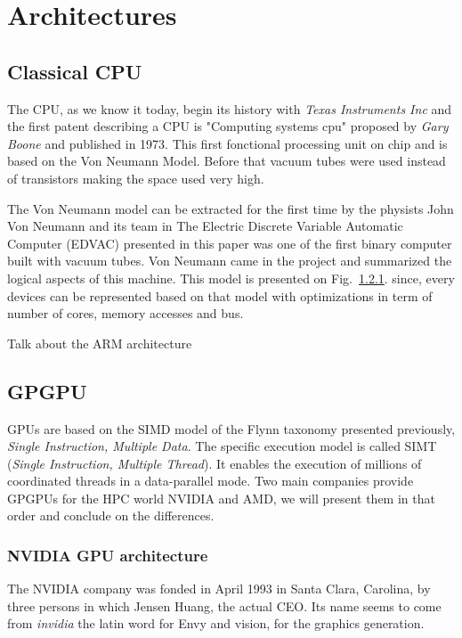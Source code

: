 \section{Architectures}
\subsection{Classical CPU}

The CPU, as we know it today, begin its history with \textit{Texas Instruments Inc} and the first patent describing a CPU is "Computing systems cpu" proposed by \textit{Gary Boone} and published in 1973.
This first fonctional processing unit on chip and is based on the Von Neumann Model.
Before that vacuum tubes were used instead of transistors making the space used very high.

The Von Neumann model can be extracted for the first time by the physists John Von Neumann and its team in \cite{} 
The Electric Discrete Variable Automatic Computer (EDVAC) presented in this paper was one of the first binary computer built with vacuum tubes. Von Neumann came in the project and summarized the logical aspects of this machine. 
This model is presented on Fig.~\ref{}.
since, every devices can be represented based on that model with optimizations in term of number of cores, memory accesses and bus. 




Talk about the ARM architecture 

\subsection{GPGPU}

GPUs are based on the SIMD model of the Flynn taxonomy presented previously, \emph{Single Instruction, Multiple Data}.
The specific execution model is called SIMT (\emph{Single Instruction, Multiple Thread}). It enables the execution of millions of coordinated threads in a data-parallel mode. 
Two main companies provide GPGPUs for the HPC world NVIDIA and AMD, we will present them in that order and conclude on the differences. 

\subsubsection{NVIDIA GPU architecture}

The NVIDIA company was fonded in April 1993 in Santa Clara, Carolina, by three persons in which Jensen Huang, the actual CEO.
Its name seems to come from \textit{invidia} the latin word for Envy and vision, for the graphics generation. 

